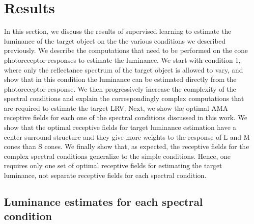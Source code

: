 \documentclass{jov}
\begin{document}
\section{Results} \label{Results}
In this section, we discuss the results of supervised learning to estimate the luminance of the target object on the the various conditions we described previously. We describe the computations that need to be performed on the cone photoreceptor responses to estimate the luminance. We start with condition 1, where only the reflectance spectrum of the target object is allowed to vary, and show that in this condition the luminance can be estimated directly from the photoreceptor response. We then progressively increase the complexity of the spectral conditions and explain the correspondingly complex computations that are required to estimate the target LRV. Next, we show the optimal AMA receptive fields for each one of the spectral conditions discussed in this work. We show that the optimal receptive fields for target luminance estimation have a center surround structure and they give more weights to the response of L and M cones than S cones. We finally show that, as expected, the receptive fields for the complex spectral conditions generalize to the simple conditions. Hence, one requires only one set of optimal receptive fields for estimating the target luminance, not separate receptive fields for each spectral condition.

\subsection{Luminance estimates for each spectral condition}
\end{document}

